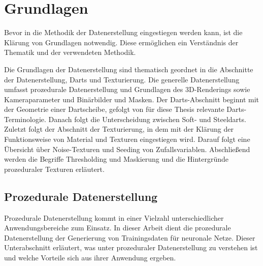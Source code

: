 
\section{Grundlagen}
\label{sec:daten:grundlagen}

Bevor in die Methodik der Datenerstellung eingestiegen werden kann, ist die Klärung von Grundlagen notwendig. Diese ermöglichen ein Verständnis der Thematik und der verwendeten Methodik.

Die Grundlagen der Datenerstellung sind thematisch geordnet in die Abschnitte der Datenerstellung, Darts und Texturierung. Die generelle Datenerstellung umfasst prozedurale Datenerstellung und Grundlagen des 3D-Renderings sowie Kameraparameter und Binärbilder und Masken. Der Darts-Abschnitt beginnt mit der Geometrie einer Dartscheibe, gefolgt von für diese Thesis relevante Darts-Terminologie. Danach folgt die Unterscheidung zwischen Soft- und Steeldarts. Zuletzt folgt der Abschnitt der Texturierung, in dem mit der Klärung der Funktionsweise von Material und Texturen eingestiegen wird. Darauf folgt eine Übersicht über Noise-Texturen und Seeding von Zufallsvariablen. Abschließend werden die Begriffe Thresholding und Maskierung und die Hintergründe prozeduraler Texturen erläutert.


\subsection{Prozedurale Datenerstellung}  %
\label{sec:prozedurale_datenerstellung}

Prozedurale Datenerstellung kommt in einer Vielzahl unterschiedlicher Anwendungsbereiche zum Einsatz. In dieser Arbeit dient die prozedurale Datenerstellung der Generierung von Trainingsdaten für neuronale Netze. Dieser Unterabschnitt erläutert, was unter prozeduraler Datenerstellung zu verstehen ist und welche Vorteile sich aus ihrer Anwendung ergeben.

